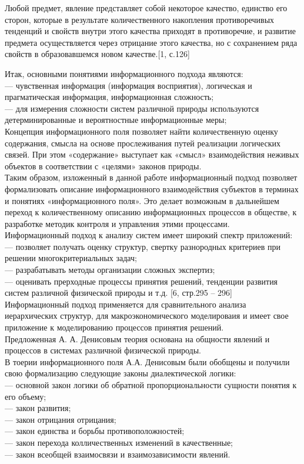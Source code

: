 \documentclass[a4paper,12pt]{report}
\begin{document}
Любой предмет, явление представляет собой некоторое качество, единство его сторон, которые в результате количественного накопления противоречивых тенденций и свойств внутри этого качества приходят в противоречие, и развитие предмета осуществляется через отрицание этого качества, но с сохранением ряда свойств в образовавшемся новом качестве.[1, с.126]

Итак, основными понятиями информационного подхода являются: \\
— чувственная информация (информация восприятия), логическая и прагматическая информация, информационная сложность;\\
— для измерения сложности систем различной природы используются детерминированные и вероятностные информационные меры;\\
Концепция информационного поля позволяет найти количественную оценку содержания, смысла на основе прослеживания путей реализации логических связей. При этом «содержание» выступает как «смысл» взаимодействия неживых объектов в соответствии с «целями» законов природы.\\
Таким образом, изложенный в данной работе информационный подход позволяет формализовать описание информационного взаимодействия субъектов в терминах и понятиях «информационного поля». Это делает возможным в дальнейшем переход к количественному описанию информационных процессов в обществе, к разработке методик контроля и управления этими процессами. \\
 Информационный подход к анализу систем имеет широкий спектр приложений:\\
—  позволяет получать оценку структур, свертку разнородных критериев при решении многокритериальных задач;\\
—  разрабатывать методы организации сложных экспертиз;\\
—  оценивать прерходные процессы принятия решений, тенденции развития систем различной физической природы и т.д. [6, стр.295 – 296]\\ Информационный подход применяется для сравнительного анализа иерархических структур, для макроэкономического моделироваия и  имеет свое приложение к моделированию процессов принятия решений.\\
Предложенная А. А. Денисовым теория основана на общности явлений и процессов в системах различной физической природы.\\
В тоерии информационного поля А.А. Денисовым были обобщены и получили свою формализацию следующие законы диалектической логики:\\
—  основной закон логики об обратной пропорциональности сущности понятия к его объему;\\
—  закон развития;\\
—  закон отрицания отрицания;\\
—  закон единства и борьбы противоположностей;\\
—  закон перехода колличественных изменений в качественные;\\
—  закон всеобщей взаимосвязи и взаимозависимости явлений.
\end{document}
